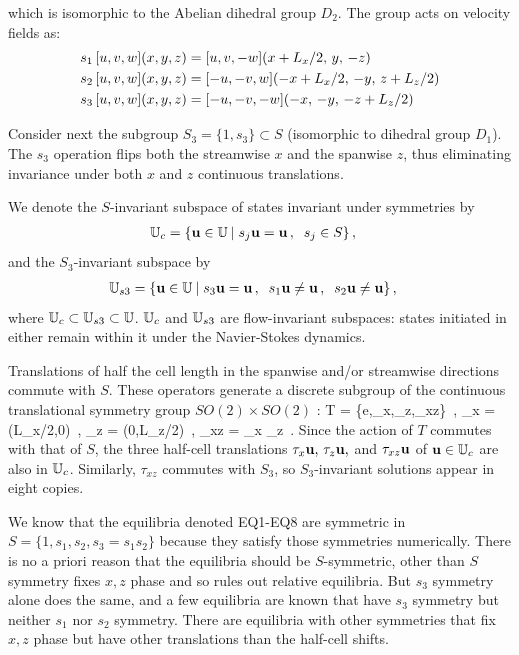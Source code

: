 \documentclass[letter,10pt,openany]{article}
\begin{document}
which is isomorphic to
the Abelian dihedral group $D_2$. The group acts on velocity fields
as:
\begin{align}
s_1 \, [u, v, w](x,y,z) &= [u, v, -w](x+L_x/2,\, y,\, -z) \nonumber \\ 
s_2 \, [u, v, w](x,y,z) &= [-u, -v, w](-x+L_x/2,\,-y,\,z+L_z/2) \label{shiftRot} \\
s_3 \, [u, v, w](x,y,z) &= [-u,-v,-w](-x,\, -y,\, -z+L_z/2)  \nonumber 
\,
\end{align}

Consider next the subgroup $S_3 = \{1,s_3\} \subset S$ (isomorphic to
dihedral group $D_1$). The $s_3$ operation flips both the streamwise
$x$ and the spanwise $z$, thus eliminating invariance under both $x$
and $z$ continuous translations. 


We denote the $S$-invariant subspace of states invariant under
symmetries  by
\begin{align}
\mathbb{U}_{c}  &= \{{\bf u} \in \mathbb{U}  \: | \;
              s_j {\bf u} = {\bf u}\,, \;\;  s_j \in S \}
\,,
\label{symmSubspU}
\end{align}
and the $S_3$-invariant subspace by
\begin{align}
\bbUthree  &= \{\bu \in \bbU  \: | \;
              s_3 \bu = \bu\,, \;\; %
              s_1 \bu \neq \bu\,, \;\;  s_2 \bu \neq \bu
               \}
\,,
\label{symmUthree}
\end{align}
where $ \mathbb{U}_{c} \subset \mathbb{U}_{s3} \subset \mathbb{U}$.
%
$\mathbb{U}_{c}$ and  $\mathbb{U}_{s3}$ are flow-invariant subspaces: states initiated
in either remain within it under the Navier-Stokes dynamics.


Translations of half the cell length in the spanwise and/or streamwise
directions commute with $S$. These operators generate a discrete
subgroup of the continuous translational symmetry group $SO(2) \times
SO(2)$ :
\beq
T = \{e,\tau_x,\tau_z,\tau_{xz}\}
    \,,\qquad
    \tau_x = \tau(L_x/2,0)
    \,,\;
    \tau_z = \tau(0,L_z/2)
    \,,\;
    \tau_{xz} = \tau_x \tau_z
\,.
Since the action of $T$ commutes with that of $S$,
the three half-cell translations $\tau_x {\bf u}, \, \tau_z {\bf u},$ and
$\tau_{xz} {\bf u}$ of ${\bf u} \in \mathbb{U}_{c}$ are also in $\mathbb{U}_{c}$.
Similarly, $\tau_{xz}$ commutes with $S_3$, so $S_3$-invariant
solutions appear in eight copies.

We know that the equilibria denoted EQ1-EQ8 are symmetric in $S = \{1, s_1, s_2, s_3 = s_1
s_2\}$ because they satisfy those symmetries numerically. There is no
a priori reason that the equilibria should be $S$-symmetric, other than $S$ symmetry
fixes $x,z$ phase and so rules out relative equilibria. But $s_3$ symmetry
alone does the same, and a few equilibria are known that have $s_3$ symmetry
but neither $s_1$ nor $s_2$ symmetry. There are equilibria with other symmetries
that fix $x,z$ phase but have other translations than the half-cell shifts.
\end{document}
